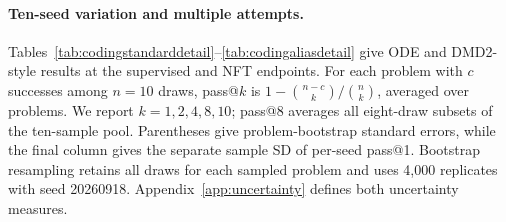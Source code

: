 \documentclass[11pt,letterpaper]{article}
\begin{document}
\paragraph{Ten-seed variation and multiple attempts.}
Tables~\ref{tab:codingstandarddetail}--\ref{tab:codingaliasdetail} give ODE and DMD2-style results at the supervised and NFT endpoints. For each problem with $c$ successes among $n=10$ draws, pass@$k$ is $1-\binom{n-c}{k}/\binom{n}{k}$, averaged over problems. We report $k=1,2,4,8,10$; pass@8 averages all eight-draw subsets of the ten-sample pool. Parentheses give problem-bootstrap standard errors, while the final column gives the separate sample SD of per-seed pass@1. Bootstrap resampling retains all draws for each sampled problem and uses 4,000 replicates with seed 20260918. Appendix~\ref{app:uncertainty} defines both uncertainty measures.
\end{document}
